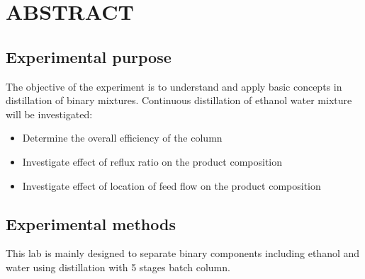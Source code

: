 \section{ABSTRACT}

\subsection{Experimental purpose}

The objective of the experiment is to understand and apply basic concepts in distillation of binary mixtures. Continuous distillation of ethanol water mixture will be investigated:

\begin{itemize}
    \item Determine the overall efficiency of the column
    \item Investigate effect of reflux ratio on the product composition
    \item Investigate effect of location of feed flow on the product composition
\end{itemize}

\subsection{Experimental methods}

This lab is mainly designed to separate binary components including ethanol and water using distillation with 5 stages batch column.
